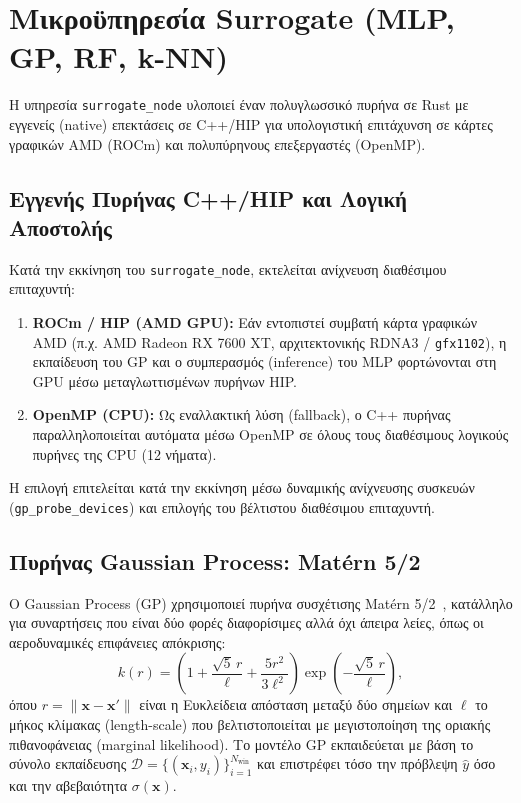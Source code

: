 \section{Μικροϋπηρεσία Surrogate (MLP, GP, RF, k-NN)}
\label{sec:impl_surrogate}

Η υπηρεσία \texttt{surrogate\_node} υλοποιεί έναν πολυγλωσσικό πυρήνα σε Rust με εγγενείς (native) επεκτάσεις σε C++/HIP για υπολογιστική επιτάχυνση σε κάρτες γραφικών AMD (ROCm) και πολυπύρηνους επεξεργαστές (OpenMP).

\subsection{Εγγενής Πυρήνας C++/HIP και Λογική Αποστολής}
\label{subsec:impl_native_engine}

Κατά την εκκίνηση του \texttt{surrogate\_node}, εκτελείται ανίχνευση διαθέσιμου επιταχυντή:
\begin{enumerate}
    \item \textbf{ROCm / HIP (AMD GPU):} Εάν εντοπιστεί συμβατή κάρτα γραφικών AMD (π.χ. AMD Radeon RX 7600 XT, αρχιτεκτονικής RDNA3 / \texttt{gfx1102}), η εκπαίδευση του GP και ο συμπερασμός (inference) του MLP φορτώνονται στη GPU μέσω μεταγλωττισμένων πυρήνων HIP.
    \item \textbf{OpenMP (CPU):} Ως εναλλακτική λύση (fallback), ο C++ πυρήνας παραλληλοποιείται αυτόματα μέσω OpenMP σε όλους τους διαθέσιμους λογικούς πυρήνες της CPU (12 νήματα).
\end{enumerate}
Η επιλογή επιτελείται κατά την εκκίνηση μέσω δυναμικής ανίχνευσης συσκευών (\texttt{gp\_probe\_devices}) και επιλογής του βέλτιστου διαθέσιμου επιταχυντή.

\subsection{Πυρήνας Gaussian Process: Matérn 5/2}
\label{subsec:impl_gp_kernel}

Ο Gaussian Process (GP) χρησιμοποιεί πυρήνα συσχέτισης Matérn 5/2~\cite{rasmussen2006gaussian}, κατάλληλο για συναρτήσεις που είναι δύο φορές διαφορίσιμες αλλά όχι άπειρα λείες, όπως οι αεροδυναμικές επιφάνειες απόκρισης:
\begin{equation}
\label{eq:matern52}
k(r) = \left(1 + \frac{\sqrt{5}\,r}{\ell} + \frac{5r^2}{3\ell^2}\right)\exp\!\left(-\frac{\sqrt{5}\,r}{\ell}\right),
\end{equation}
όπου $r = \|\mathbf{x} - \mathbf{x}'\|$ είναι η Ευκλείδεια απόσταση μεταξύ δύο σημείων και $\ell$ το μήκος κλίμακας (length-scale) που βελτιστοποιείται με μεγιστοποίηση της οριακής πιθανοφάνειας (marginal likelihood). Το μοντέλο GP εκπαιδεύεται με βάση το σύνολο εκπαίδευσης $\mathcal{D} = \{(\mathbf{x}_i, y_i)\}_{i=1}^{N_{\text{win}}}$ και επιστρέφει τόσο την πρόβλεψη $\hat{y}$ όσο και την αβεβαιότητα $\sigma(\mathbf{x})$.

